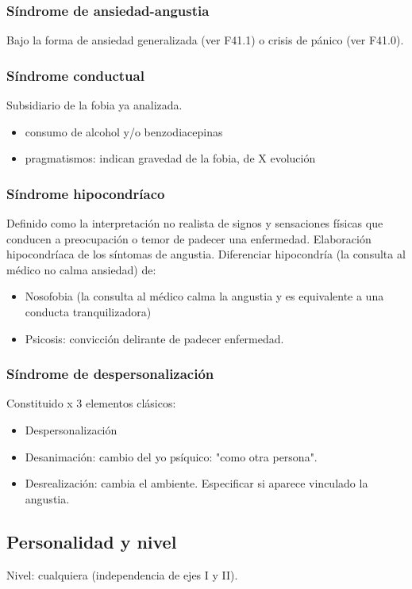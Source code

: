 \subsubsection*{Síndrome de ansiedad-angustia}
Bajo la forma de ansiedad generalizada (ver F41.1) o crisis de pánico (ver F41.0).
\subsubsection*{Síndrome conductual}
Subsidiario de la fobia ya analizada.
\begin{itemize}
	\item consumo de alcohol y/o benzodiacepinas
	\item pragmatismos: indican gravedad de la fobia, de X evolución
\end{itemize}
\subsubsection*{Síndrome hipocondríaco}
Definido como la interpretación no realista de signos y sensaciones físicas que conducen a preocupación o temor de padecer una enfermedad. Elaboración hipocondríaca de los síntomas de angustia. Diferenciar hipocondría (la consulta al médico no calma ansiedad) de:
\begin{itemize}
	\item Nosofobia (la consulta al médico calma la angustia y es equivalente a una conducta tranquilizadora)
	\item Psicosis: convicción delirante de padecer enfermedad.
\end{itemize}
\subsubsection*{Síndrome de despersonalización}
Constituido x 3 elementos clásicos:
\begin{itemize}
	\item Despersonalización
	\item Desanimación: cambio del yo psíquico: "como otra persona".
	\item Desrealización: cambia el ambiente. Especificar si aparece vinculado la angustia.
\end{itemize}
\subsection*{Personalidad y nivel}
Nivel: cualquiera (independencia de ejes I y II).

